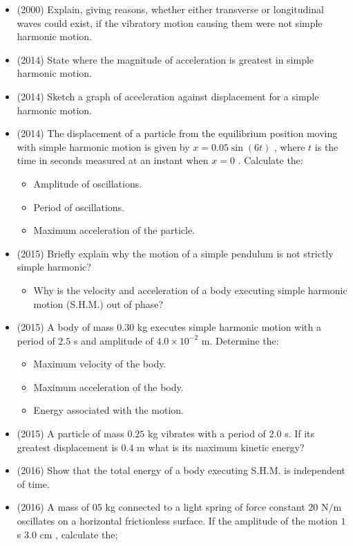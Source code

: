 \documentclass{article}
\begin{document}
\begin{itemize}
\item (2000)  Explain, giving reasons, whether either transverse or longitudinal waves could exist, if the vibratory motion causing them were not simple harmonic motion.
\item (2014)  State where the magnitude of acceleration is greatest in simple harmonic motion.
\item (2014)  Sketch a graph of acceleration against displacement for a simple harmonic motion.
\item (2014)  The displacement of a particle from the equilibrium position moving with simple harmonic motion is given by $ x=0.05 \sin(6t)$ , where $ t$ is the time in seconds measured at an instant when $ x=0$ .  Calculate the:
 \begin{itemize}
\item Amplitude of oscillations.
\item Period of oscillations. 
\item  Maximum acceleration of the particle. 
\end{itemize}
\item (2015)  Briefly explain why the motion of a simple pendulum is not strictly simple harmonic? 
 \begin{itemize}
\item Why is the velocity and acceleration of a body executing simple harmonic motion (S.H.M.) out of phase? 
\end{itemize}
\item (2015)  A body of mass $ 0.30$ kg executes simple harmonic motion with a period of $ 2.5$ s and amplitude of $ 4.0\times10^{-2}$ m. Determine the:
 \begin{itemize}
\item Maximum velocity of the body. 
\item Maximum acceleration of the body. 
\item Energy associated with the motion.
\end{itemize}
\item (2015)  A particle of mass $ 0.25$ kg vibrates with a period of $ 2.0$ s. If its greatest displacement is $ 0.4$ m what is its maximum kinetic energy?
\item (2016)  Show that the total energy of a body executing S.H.M. is independent of time.
\item (2016)  A mass of $ 05$ kg connected to a light spring of force constant $ 20$ N$/$m oscillates on a  horizontal frictionless surface. If the amplitude of the motion $ 1$ s $ 3.0$ cm , calculate the;

\end{itemize}
\end{document}
